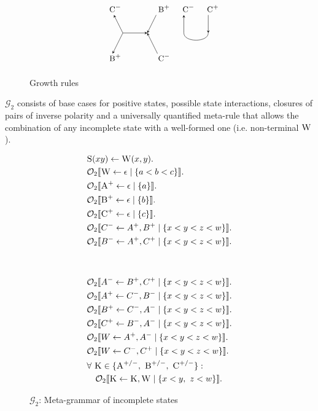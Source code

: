 \documentclass{llncs}
\newcommand\s{\textsc}
\newcommand{\Orderr}[5]{
	\mathcal{#1}_{#5}\llbracket #2 \leftarrow #3 \mid \{ #4 \} \rrbracket.
}
\newcommand{\Or}[4]{\Orderr{O}{#1}{#2}{#3}{#4}}
\begin{document}
\begin{figure}
\[\begin{tikzpicture}
\node (i33) at (7,-5) {$\textsc{\small C}^-$};
\node (ii33) at (9,-5) {$\textsc{\small B}^+$};
\node (d33) at (7.5,-6) {};
\node (dd33) at (8.5,-6) {};
\node (o33) at (7,-7) {$\textsc{\small B}^+$};
\node (oo33) at (9,-7) {$\textsc{\small C}^-$};
\draw[<-,>=stealth] (i33) -- (d33.center);
\draw[->,>=stealth] (ii33) -- (dd33.center);
\draw[->,>=stealth] (d33.center) -- (dd33.center);
\draw[->,>=stealth, shorten >=5pt] (d33.center) -- (o33.center);
\draw[<-,>=stealth, shorten >=5pt] (dd33.center) -- (oo33.center);

\node (i34) at (10,-5) {$\textsc{\small C}^-$};
\node (ii34) at (11,-5) {$\textsc{\small C}^+$};
\node (d34) at (10,-6) {};
\node (dd34) at (11,-6) {};\draw[<-,>=stealth] (i34) -- (d34.center);
\draw[->,>=stealth] (ii34) -- (dd34.center);
\draw (d34.center) edge [-,>=stealth,bend right=90] (dd34.center);

\end{tikzpicture}
\]
\caption{Growth rules}
\label{fig:rules}
\end{figure}

$\mathcal{G}_2$ consists of base cases for positive states, possible state interactions, closures of pairs of inverse polarity and a universally quantified meta-rule that allows the combination of any incomplete state with a well-formed one (i.e. non-terminal $\s{W}$).
\begin{figure}
    \centering
		\begin{minipage}{.2\textwidth}
		\begin{align*}
		&\s{S}(xy) \leftarrow \s{W}(x,y). \\
		&\Or{\s{W}}{\epsilon}{a < b < c}{2} \\
		&\Or{\s{A}^+}{\epsilon}{a}{2} \\
		&\Or{\s{B}^+}{\epsilon}{b}{2} \\
		&\Or{\s{C}^+}{\epsilon}{c}{2} \\
		&\Or{C^-}{A^+, B^+}{x < y < z < w}{2} \\
		&\Or{B^-}{A^+, C^+}{x < y < z < w}{2}
		\end{align*}
		\end{minipage}
~ ~ ~ ~ ~ ~
	    \begin{minipage}{.2\textwidth}
		\begin{align*}
		&\Or{A^-}{B^+, C^+}{x < y < z < w}{2} \\
		&\Or{A^+}{C^-, B^-}{x < y < z < w}{2} \\
		&\Or{B^+}{C^-, A^-}{x < y < z < w}{2} \\
		&\Or{C^+}{B^-, A^-}{x < y < z < w}{2} \\
		&\Or{W}{A^+, A^-}{x < y < z < w}{2} \\
		&\Or{W}{C^-, C^+}{x < y < z < w}{2} \\
		&\forall \ \s{K} \in \{\textsc{A}^{+/-},\ \textsc{B}^{+/-},\ \textsc{C}^{+/-}\}:\\ 
		&\quad\Or{\s{K}}{\s{K}, \s{W}}{x < y,\ z < w}{2}
		\end{align*}
		\end{minipage}
    \caption{$\mathcal{G}_2$: Meta-grammar of incomplete states}%
    \label{fig:g2}
\end{figure}
\end{document}
